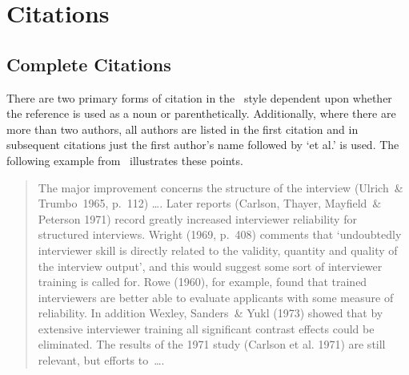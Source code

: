 \section{Citations}

\subsection{Complete Citations}

There are two primary forms of citation in the \harvard\ style dependent
upon whether the reference is used as a noun or parenthetically.
Additionally, where there are more than two authors, all authors are listed in
the first citation and in subsequent citations just the first author's name
followed by `et al.' is used.
The following example from \ illustrates these points.
\begin{quote}
The major improvement concerns the structure of the interview
(Ulrich~\& Trumbo~1965, p.~112) \ldots .
Later reports (Carlson, Thayer, Mayfield~\& Peterson 1971) record greatly 
increased interviewer reliability for structured interviews.
Wright (1969, p.~408) comments that `undoubtedly interviewer skill is
directly related to the validity, quantity and quality of the interview output',
and this would suggest some sort of interviewer training is called for.
Rowe (1960), for example, found that trained interviewers are better able to
evaluate applicants with some measure of reliability.
In addition Wexley, Sanders~\& Yukl (1973) showed that by extensive interviewer
training all significant contrast effects could be eliminated.
The results of the 1971 study (Carlson et al. 1971) are still relevant, but
efforts to~\ldots.
\end{quote}

